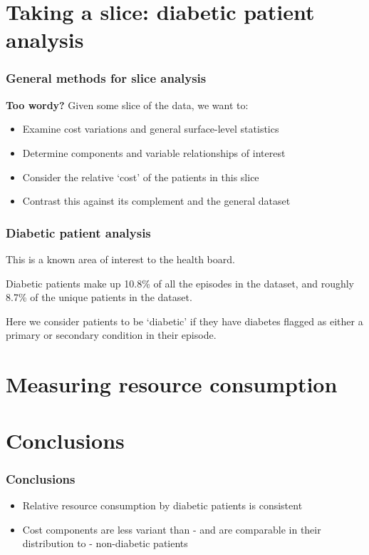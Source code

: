 \section{Taking a slice: diabetic patient analysis}
\graphicspath{{./img/diabetes/}}

\begin{frame}
    \frametitle{General methods for slice analysis}
    \textbf{Too wordy?}
    Given some slice of the data, we want to:
    \begin{itemize}
        \item Examine cost variations and general surface-level statistics
        \item Determine components and variable relationships of interest
        \item Consider the relative `cost' of the patients in this slice
        \item Contrast this against its complement and the general dataset
    \end{itemize}
\end{frame}

\begin{frame}
    \frametitle{Diabetic patient analysis}

    This is a known area of interest to the health board.

    \vspace{10pt}
    Diabetic patients make up 10.8\% of all the episodes in the dataset, and
    roughly 8.7\% of the unique patients in the dataset.

    \vspace{10pt}
    Here we consider patients to be `diabetic' if they have diabetes flagged as
    either a primary or secondary condition in their episode.
\end{frame}





\section{Measuring resource consumption}


\section{Conclusions}
\begin{frame}
    \frametitle{Conclusions}

    \begin{itemize}
        \item Relative resource consumption by diabetic patients is consistent
        \item Cost components are less variant than \-- and are comparable in
            their distribution to \-- non-diabetic patients
    \end{itemize}
\end{frame}
